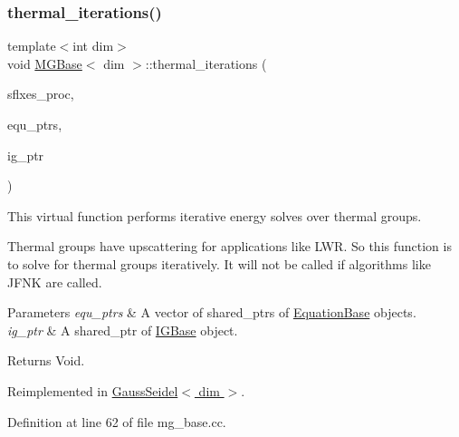 \mbox{\label{class_m_g_base_a9d3c6ab6e58f0119badb30feedb2ac4d}} 
\subsubsection{\texorpdfstring{thermal\+\_\+iterations()}{thermal\_iterations()}}
{\footnotesize\ttfamily template$<$int dim$>$ \\
void \hyperlink{class_m_g_base}{M\+G\+Base}$<$ dim $>$\+::thermal\+\_\+iterations (\begin{DoxyParamCaption}\item[{std\+::vector$<$ Vector$<$ double $>$ $>$ \&}]{sflxes\+\_\+proc,  }\item[{std\+::vector$<$ std\+\_\+cxx11\+::shared\+\_\+ptr$<$ \hyperlink{class_equation_base}{Equation\+Base}$<$ dim $>$ $>$ $>$ \&}]{equ\+\_\+ptrs,  }\item[{std\+\_\+cxx11\+::shared\+\_\+ptr$<$ \hyperlink{class_i_g_base}{I\+G\+Base}$<$ dim $>$ $>$}]{ig\+\_\+ptr }\end{DoxyParamCaption})\hspace{0.3cm}{\ttfamily [virtual]}}

This virtual function performs iterative energy solves over thermal groups.

Thermal groups have upscattering for applications like L\+WR. So this function is to solve for thermal groups iteratively. It will not be called if algorithms like J\+F\+NK are called.


\begin{DoxyParams}{Parameters}
{\em equ\+\_\+ptrs} & A vector of shared\+\_\+ptr\textquotesingle{}s of \hyperlink{class_equation_base}{Equation\+Base} objects. \\
\hline
{\em ig\+\_\+ptr} & A shared\+\_\+ptr of \hyperlink{class_i_g_base}{I\+G\+Base} object. \\
\hline
\end{DoxyParams}
\begin{DoxyReturn}{Returns}
Void. 
\end{DoxyReturn}


Reimplemented in \hyperlink{class_gauss_seidel_a8db6abbdc88413cbf502ac606b415733}{Gauss\+Seidel$<$ dim $>$}.



Definition at line 62 of file mg\+\_\+base.\+cc.



